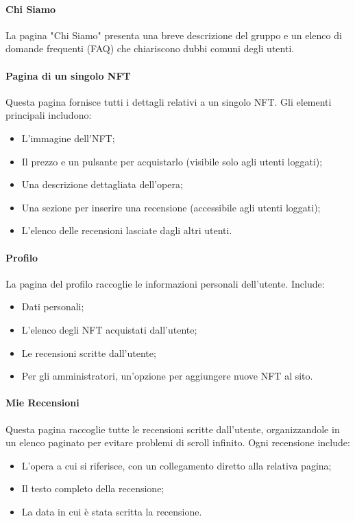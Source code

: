 \documentclass[10pt]{article}
\begin{document}
\paragraph{Chi Siamo} La pagina "Chi Siamo" presenta una breve descrizione del gruppo e un elenco di domande frequenti (FAQ) che chiariscono dubbi comuni degli utenti.

\paragraph{Pagina di un singolo NFT} Questa pagina fornisce tutti i dettagli relativi a un singolo NFT. Gli elementi principali includono: \begin{itemize} \item L’immagine dell’NFT; \item Il prezzo e un pulsante per acquistarlo (visibile solo agli utenti loggati); \item Una descrizione dettagliata dell’opera; \item Una sezione per inserire una recensione (accessibile agli utenti loggati); \item L’elenco delle recensioni lasciate dagli altri utenti. \end{itemize}

\paragraph{Profilo} La pagina del profilo raccoglie le informazioni personali dell’utente. Include: \begin{itemize} \item Dati personali; \item L’elenco degli NFT acquistati dall’utente; \item Le recensioni scritte dall’utente; \item Per gli amministratori, un’opzione per aggiungere nuove NFT al sito. \end{itemize}

\paragraph{Mie Recensioni}
Questa pagina raccoglie tutte le recensioni scritte dall’utente, organizzandole in un elenco paginato per evitare problemi di scroll infinito. Ogni recensione include:
\begin{itemize} \item L’opera a cui si riferisce, con un collegamento diretto alla relativa pagina; \item Il testo completo della recensione; \item La data in cui è stata scritta la recensione.
\end{itemize} 
\end{document}
